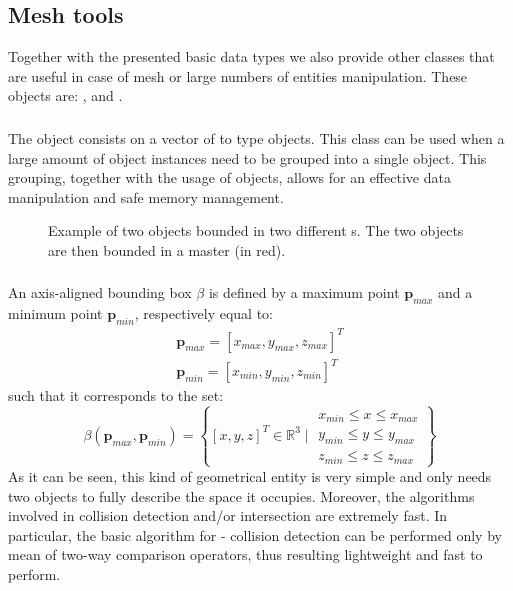 \subsection{Mesh tools}
Together with the presented basic data types we also provide other classes that are useful in case of mesh or large numbers of entities manipulation. These objects are: \Collection{}, \Aabb{} and \AabbTree{}.

\subsubsection{\Collection{}}
The \Collection{} object consists on a vector of \SharedPointer{} to \Entity{} type objects. This class can be used when a large amount of \Entity{} object instances need to be grouped into a single object. This grouping, together with the usage of \SharedPointer{} objects, allows for an effective data manipulation and safe memory management.

\begin{figure}[!ht]
  \centering
  
  \caption{Example of two \Collection{} objects bounded in two different \Aabb{}s. The two \Aabb{} objects are then bounded in a master \Aabb{} (in red).}
  \label{fig::collection}
\end{figure}

\subsubsection{\Aabb}
An axis-aligned bounding box $\beta$ is defined by a maximum point $\boldsymbol{p}_{max}$ and a minimum point $\boldsymbol{p}_{min}$, respectively equal to:
%
\begin{equation*}
\begin{split}
\boldsymbol{p}_{max} = \left[x_{max}, y_{max}, z_{max}\right]^T \\
\boldsymbol{p}_{min} = \left[x_{min}, y_{min}, z_{min}\right]^T ~
\end{split}
\end{equation*}
%
such that it corresponds to the set:
%
\begin{equation*}
  \beta (\boldsymbol{p}_{max}, \boldsymbol{p}_{min}) =
  \left\{
  \left[x, y, z\right]^T \in \mathbb{R}^3\;\bigg|\;
  \begin{array}{c}
    x_{min} \leq x \leq x_{max}\\
    y_{min} \leq y \leq y_{max}\\
    z_{min} \leq z \leq z_{max}
  \end{array}
  \right\}
\end{equation*}
%
As it can be seen, this kind of geometrical entity is very simple and only needs two \Point{} objects to fully describe the space it occupies. Moreover, the algorithms involved in \Aabb{} collision detection and/or intersection are extremely fast. In particular, the basic algorithm for \Aabb{}-\Aabb{} collision detection can be performed only by mean of two-way comparison operators, thus resulting lightweight and fast to perform.

